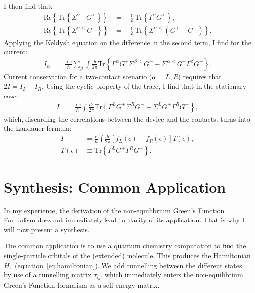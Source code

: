 I then find that:
\begin{align*}
\text{Re}\left\{\text{Tr}\left\{ \Sigma^{\alpha+} G^<\right\}\right\} &= - \frac{\imath}{2} \text{Tr}\left\{ \Gamma^\alpha G^< \right\} ,\\
\text{Re}\left\{\text{Tr}\left\{ \Sigma^{\alpha<} G^-\right\}\right\} &= - \frac{\imath}{2} \text{Tr}\left\{\Sigma^{\alpha<} \left(G^+ - G^-\right)\right\}.
\end{align*}
Applying the Keldysh equation on the difference in the second term, I find for the current:
\begin{align*}
I_\alpha &= \frac{\imath e}{\hbar} \sum_\beta \int \frac{d\epsilon}{2\pi} \text{Tr}\left\{ \Gamma^\alpha G^+ \Sigma^{\beta <}G^- - \Sigma^{\alpha<}G^+\Gamma^\beta G^- \right\}.
\end{align*}
Current conservation for a two-contact scenario ($\alpha=L,R$) requires that $2 I = I_L - I_R$. Using the cyclic property of the trace, I find that in the stationary case:
\begin{align*}
I &= \frac{\imath e}{\hbar} \int \frac{d\epsilon}{2\pi} \text{Tr}\left\{ \Gamma^L G^+ \Sigma^R G^- - \Sigma^L G^+ \Gamma^R G^-\right\},
\end{align*}
which, discarding the correlations between the device and the contacts, turns into the Landauer formula:
\begin{align}
I &= \frac{e}{\hbar} \int \frac{d\epsilon}{2\pi} \left[ f_L(\epsilon) - f_R(\epsilon)\right] T(\epsilon) \label{eq:landauer},\\
T(\epsilon)&\equiv \text{Tr}\left\{ \Gamma^L G^+ \Gamma^R G^-\right\}\nonumber.
\end{align}

\section{Synthesis: Common Application}
\label{sec:synthesis}


In my experience, the derivation of the non-equilibrium Green's Function Formalism does not immediately lead to clarity of its application. That is why I will now present a synthesis.

The common application is to use a quantum chemistry computation to find the single-particle orbitals of the (extended) molecule. This produces the Hamiltonian $H_1$ (equation~\ref{eq:hamiltonian}). We add tunnelling between the different states by use of a tunnelling matrix $\tau_{ij}$, which immediately enters the non-equilibrium Green's Function formalism as a self-energy matrix. 

